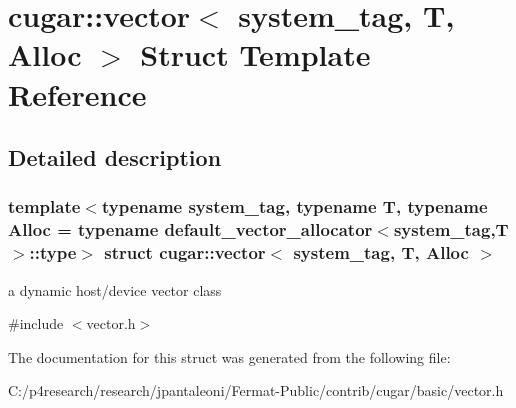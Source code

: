 \hypertarget{structcugar_1_1vector}{}\section{cugar\+:\+:vector$<$ system\+\_\+tag, T, Alloc $>$ Struct Template Reference}
\label{structcugar_1_1vector}


\subsection{Detailed description}
\subsubsection*{template$<$typename system\+\_\+tag, typename T, typename Alloc = typename default\+\_\+vector\+\_\+allocator$<$system\+\_\+tag,\+T$>$\+::type$>$\newline
struct cugar\+::vector$<$ system\+\_\+tag, T, Alloc $>$}

a dynamic host/device vector class 

{\ttfamily \#include $<$vector.\+h$>$}



The documentation for this struct was generated from the following file\+:\begin{DoxyCompactItemize}
\item 
C\+:/p4research/research/jpantaleoni/\+Fermat-\/\+Public/contrib/cugar/basic/vector.\+h\end{DoxyCompactItemize}
